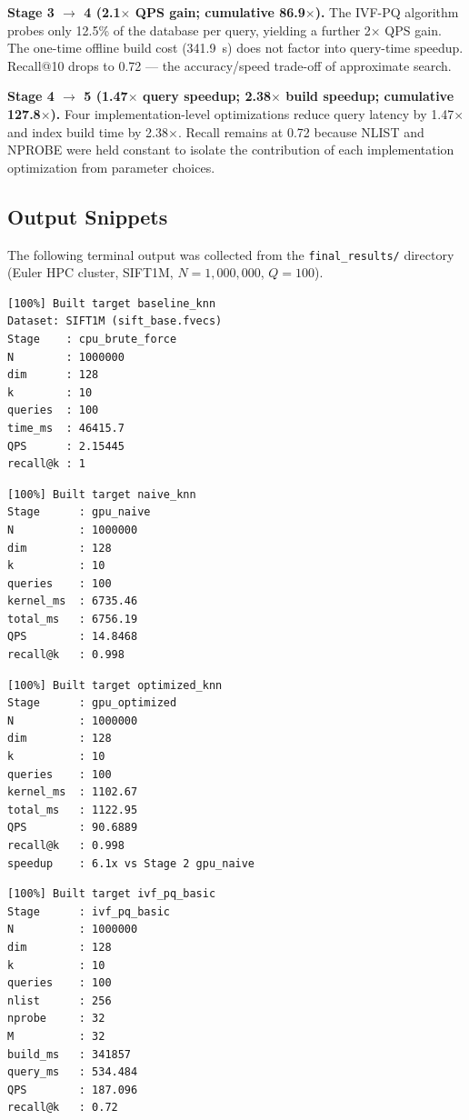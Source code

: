 \documentclass[12pt]{article}
\begin{document}
\textbf{Stage 3 $\to$ 4 (2.1$\times$ QPS gain; cumulative 86.9$\times$).}
The IVF-PQ algorithm probes only 12.5\% of the database per query, yielding
a further 2$\times$ QPS gain. The one-time offline build cost (341.9~s) does
not factor into query-time speedup. Recall@10 drops to 0.72 --- the
accuracy/speed trade-off of approximate search.

\textbf{Stage 4 $\to$ 5 (1.47$\times$ query speedup; 2.38$\times$ build speedup; cumulative 127.8$\times$).}
Four implementation-level optimizations reduce query latency by 1.47$\times$ and
index build time by 2.38$\times$.
Recall remains at 0.72 because NLIST and NPROBE were held constant to isolate
the contribution of each implementation optimization from parameter choices.

\subsection{Output Snippets}

The following terminal output was collected from the \texttt{final\_results/}
directory (Euler HPC cluster, SIFT1M, $N{=}1{,}000{,}000$, $Q{=}100$).

\begin{lstlisting}[style=terminal, caption={Stage 1 --- CPU Brute-Force (output-352694.out)}]
[100%] Built target baseline_knn
Dataset: SIFT1M (sift_base.fvecs)
Stage    : cpu_brute_force
N        : 1000000
dim      : 128
k        : 10
queries  : 100
time_ms  : 46415.7
QPS      : 2.15445
recall@k : 1
\end{lstlisting}

\begin{lstlisting}[style=terminal, caption={Stage 2 --- Naive GPU k-NN (output-352698.out)}]
[100%] Built target naive_knn
Stage      : gpu_naive
N          : 1000000
dim        : 128
k          : 10
queries    : 100
kernel_ms  : 6735.46
total_ms   : 6756.19
QPS        : 14.8468
recall@k   : 0.998
\end{lstlisting}

\begin{lstlisting}[style=terminal, caption={Stage 3 --- Shared-Memory Tiled GPU k-NN (output-352699.out)}]
[100%] Built target optimized_knn
Stage      : gpu_optimized
N          : 1000000
dim        : 128
k          : 10
queries    : 100
kernel_ms  : 1102.67
total_ms   : 1122.95
QPS        : 90.6889
recall@k   : 0.998
speedup    : 6.1x vs Stage 2 gpu_naive
\end{lstlisting}

\begin{lstlisting}[style=terminal, caption={Stage 4 --- IVF-PQ Basic (output-352710.out)}]
[100%] Built target ivf_pq_basic
Stage      : ivf_pq_basic
N          : 1000000
dim        : 128
k          : 10
queries    : 100
nlist      : 256
nprobe     : 32
M          : 32
build_ms   : 341857
query_ms   : 534.484
QPS        : 187.096
recall@k   : 0.72
\end{lstlisting}
\end{document}
